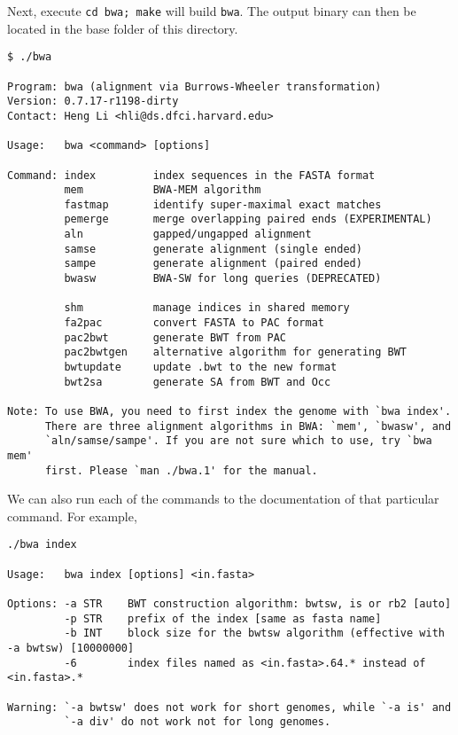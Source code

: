 \documentclass[12pt,letterpaper]{article}
\begin{document}
Next, execute \texttt{cd bwa; make} will build \texttt{bwa}. The output binary can then be located in the base folder of this directory.

\begin{verbatim}
$ ./bwa

Program: bwa (alignment via Burrows-Wheeler transformation)
Version: 0.7.17-r1198-dirty
Contact: Heng Li <hli@ds.dfci.harvard.edu>

Usage:   bwa <command> [options]

Command: index         index sequences in the FASTA format
         mem           BWA-MEM algorithm
         fastmap       identify super-maximal exact matches
         pemerge       merge overlapping paired ends (EXPERIMENTAL)
         aln           gapped/ungapped alignment
         samse         generate alignment (single ended)
         sampe         generate alignment (paired ended)
         bwasw         BWA-SW for long queries (DEPRECATED)

         shm           manage indices in shared memory
         fa2pac        convert FASTA to PAC format
         pac2bwt       generate BWT from PAC
         pac2bwtgen    alternative algorithm for generating BWT
         bwtupdate     update .bwt to the new format
         bwt2sa        generate SA from BWT and Occ

Note: To use BWA, you need to first index the genome with `bwa index'.
      There are three alignment algorithms in BWA: `mem', `bwasw', and
      `aln/samse/sampe'. If you are not sure which to use, try `bwa mem'
      first. Please `man ./bwa.1' for the manual.
\end{verbatim}

We can also run each of the commands to the documentation of that particular command. For example,

\begin{verbatim}
./bwa index

Usage:   bwa index [options] <in.fasta>

Options: -a STR    BWT construction algorithm: bwtsw, is or rb2 [auto]
         -p STR    prefix of the index [same as fasta name]
         -b INT    block size for the bwtsw algorithm (effective with -a bwtsw) [10000000]
         -6        index files named as <in.fasta>.64.* instead of <in.fasta>.* 

Warning: `-a bwtsw' does not work for short genomes, while `-a is' and
         `-a div' do not work not for long genomes.
\end{verbatim}
\end{document}
